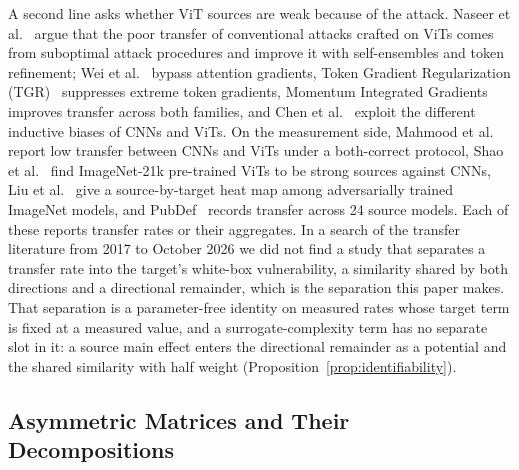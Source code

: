 A second line asks whether ViT sources are weak because of the attack. Naseer et al.~\cite{naseer2022improving} argue that the poor transfer of conventional attacks crafted on ViTs comes from suboptimal attack procedures and improve it with self-ensembles and token refinement; Wei et al.~\cite{wei2022towards} bypass attention gradients, Token Gradient Regularization (TGR)~\cite{zhang2023tgr} suppresses extreme token gradients, Momentum Integrated Gradients~\cite{ma2023transferable} improves transfer across both families, and Chen et al.~\cite{chen2023understanding} exploit the different inductive biases of CNNs and ViTs. On the measurement side, Mahmood et al.~\cite{mahmood2021robustness} report low transfer between CNNs and ViTs under a both-correct protocol, Shao et al.~\cite{shao2022adversarial} find ImageNet-21k pre-trained ViTs to be strong sources against CNNs, Liu et al.~\cite{liu2023comprehensive} give a source-by-target heat map among adversarially trained ImageNet models, and PubDef~\cite{sitawarin2024pubdef} records transfer across 24 source models. Each of these reports transfer rates or their aggregates. In a search of the transfer literature from 2017 to October 2026 we did not find a study that separates a transfer rate into the target's white-box vulnerability, a similarity shared by both directions and a directional remainder, which is the separation this paper makes. That separation is a parameter-free identity on measured rates whose target term is fixed at a measured value, and a surrogate-complexity term has no separate slot in it: a source main effect enters the directional remainder as a potential and the shared similarity with half weight (Proposition~\ref{prop:identifiability}).

\subsection{Asymmetric Matrices and Their Decompositions}
\label{subsec:rw_decomposition}

